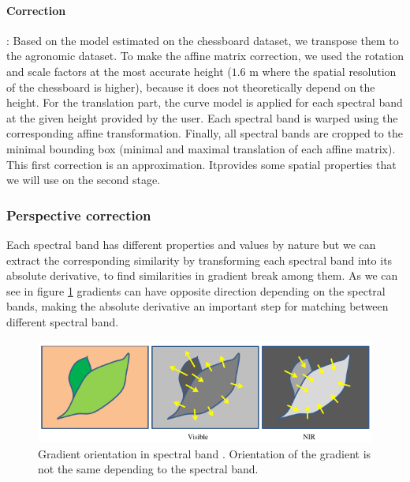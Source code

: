 \documentclass[a4paper,twoside]{article}
\begin{document}
	\paragraph{Correction} :
	Based on the model estimated on the chessboard dataset, we transpose them to the agronomic dataset.
	To make the affine matrix correction, we used the rotation and scale factors at the most accurate height
	($1.6$ m where the spatial resolution of the chessboard is higher), because it does not theoretically depend on the height.
	For the translation part, the curve model is applied for each spectral band at the given height provided by the user.
	Each spectral band is warped using the corresponding affine transformation.
	Finally, all spectral bands are cropped to the minimal bounding box (minimal and maximal translation of each affine matrix).
	This first correction is an approximation. Itprovides some spatial properties that we will use on the second stage.
	
	\subsubsection{Perspective correction}
	
	
	Each spectral band has different properties and values by nature
	but we can extract the corresponding similarity by transforming each spectral band into its absolute derivative,
	to find similarities in gradient break among them.
	As we can see in figure \ref{fig:vegetable-gradient}
	gradients can have opposite direction depending on the spectral bands,
	making the absolute derivative an important step for matching between different spectral band.
	
	\begin{figure}[h]
		\centering
		\includegraphics[width=\linewidth]{../figures/contrast-inversion.png}
		\caption{
			Gradient orientation in spectral band \cite{rabatel:hal-01684135}.
			Orientation of the gradient is not the same depending to the spectral band.
		}
		\label{fig:vegetable-gradient}
	\end{figure}
	
\end{document}
